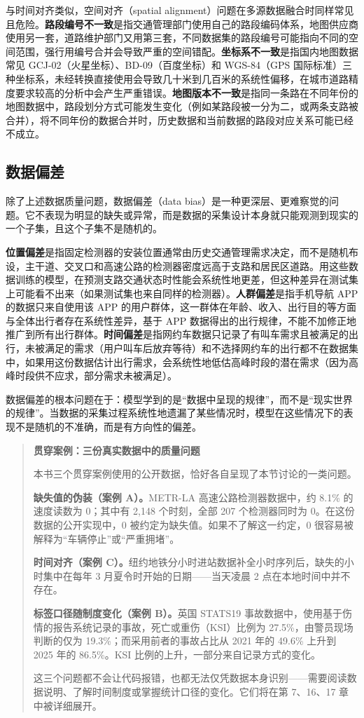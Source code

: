 与时间对齐类似，空间对齐（spatial alignment）问题在多源数据融合时同样常见且危险。\textbf{路段编号不一致}是指交通管理部门使用自己的路段编码体系，地图供应商使用另一套，道路维护部门又用第三套，不同数据集的路段编号可能指向不同的空间范围，强行用编号合并会导致严重的空间错配。\textbf{坐标系不一致}是指国内地图数据常见 GCJ-02（火星坐标）、BD-09（百度坐标）和 WGS-84（GPS 国际标准）三种坐标系，未经转换直接使用会导致几十米到几百米的系统性偏移，在城市道路精度要求较高的分析中会产生严重错误。\textbf{地图版本不一致}是指同一条路在不同年份的地图数据中，路段划分方式可能发生变化（例如某路段被一分为二，或两条支路被合并），将不同年份的数据合并时，历史数据和当前数据的路段对应关系可能已经不成立。

\subsection{数据偏差}

除了上述数据质量问题，数据偏差（data bias）是一种更深层、更难察觉的问题。它不表现为明显的缺失或异常，而是数据的采集设计本身就只能观测到现实的一个子集，且这个子集不是随机的。

\textbf{位置偏差}是指固定检测器的安装位置通常由历史交通管理需求决定，而不是随机布设，主干道、交叉口和高速公路的检测器密度远高于支路和居民区道路。用这些数据训练的模型，在预测支路交通状态时性能会系统性地更差，但这种差异在测试集上可能看不出来（如果测试集也来自同样的检测器）。\textbf{人群偏差}是指手机导航 APP 的数据只来自使用该 APP 的用户群体，这一群体在年龄、收入、出行目的等方面与全体出行者存在系统性差异，基于 APP 数据得出的出行规律，不能不加修正地推广到所有出行群体。\textbf{时间偏差}是指网约车数据只记录了有叫车需求且被满足的出行，未被满足的需求（用户叫车后放弃等待）和不选择网约车的出行都不在数据集中，如果用这份数据估计出行需求，会系统性地低估高峰时段的潜在需求（因为高峰时段供不应求，部分需求未被满足）。

数据偏差的根本问题在于：模型学到的是“数据中呈现的规律”，而不是“现实世界的规律”。当数据的采集过程系统性地遗漏了某些情况时，模型在这些情况下的表现不是随机的不准确，而是有方向性的偏差。

\begin{quote}
\textbf{贯穿案例：三份真实数据中的质量问题}

本书三个贯穿案例使用的公开数据，恰好各自呈现了本节讨论的一类问题。

\textbf{缺失值的伪装（案例 A）。}METR-LA 高速公路检测器数据中，约 8.1\% 的速度读数为 0；其中有 2,148 个时刻，全部 207 个检测器同时为 0。在这份数据的公开实现中，0 被约定为缺失值。如果不了解这一约定，0 很容易被解释为“车辆停止”或“严重拥堵”。

\textbf{时间对齐（案例 C）。}纽约地铁分小时进站数据补全小时序列后，缺失的小时集中在每年 3 月夏令时开始的日期——当天凌晨 2 点在本地时间中并不存在。

\textbf{标签口径随制度变化（案例 B）。}英国 STATS19 事故数据中，使用基于伤情的报告系统记录的事故，死亡或重伤（KSI）比例为 27.5\%，由警员现场判断的仅为 19.3\%；而采用前者的事故占比从 2021 年的 49.6\% 上升到 2025 年的 86.5\%。KSI 比例的上升，一部分来自记录方式的变化。

这三个问题都不会让代码报错，也都无法仅凭数据本身识别——需要阅读数据说明、了解时间制度或掌握统计口径的变化。它们将在第 7、16、17 章中被详细展开。
\end{quote}

